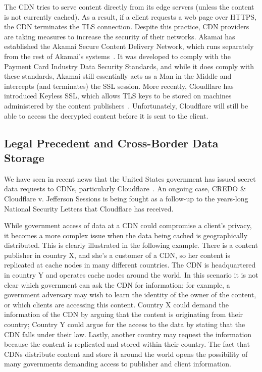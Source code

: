 The CDN tries to serve content directly from its edge servers (unless the content is not currently 
cached).  As a result, if a client requests a web page over HTTPS, the CDN terminates the TLS 
connection.  Despite this practice, CDN providers are taking measures to increase the security of 
their networks.  Akamai has established the Akamai Secure Content Delivery Network, which runs separately 
from the rest of Akamai's systems~\cite{akamai_ssl}.  It was developed to comply with the Payment Card Industry Data
Security Standards, and while it does comply with these standards, Akamai still essentially acts as a 
Man in the Middle and intercepts (and terminates) the SSL session.  More recently, Cloudflare has 
introduced Keyless SSL, which allows TLS keys to be stored on machines administered by the content 
publishers~\cite{cloudflare_keyless}.  Unfortunately, Cloudflare will still be able to access the decrypted 
content before it is sent to the client.

\subsection{Legal Precedent and Cross-Border Data Storage}
\label{sec:legal}
We have seen in recent news that the United States government has issued secret 
data requests to CDNs, particularly Cloudflare~\cite{cloudflare_nsl}.  An ongoing case, CREDO \& Cloudflare v. 
Jefferson Sessions is being fought as a follow-up to the years-long National Security Letters that 
Cloudflare has received.  

While government access of data at a CDN could compromise a client's privacy, it becomes a more complex issue when the data being cached is geographically 
distributed. This is clearly illustrated in the following example.  There is a content publisher in 
country X, and she's a customer of a CDN, so her content is replicated at cache nodes in many 
different countries.  The CDN is headquartered 
in country Y and operates cache nodes around the world.  In this scenario it is not clear which government can ask the CDN for information; for 
example, a government adversary may wish to learn the identity of the owner of the content, or which clients are accessing 
this content.  Country X could demand the information of the CDN by arguing that the content is originating 
from their country; Country Y could argue for the access to the data by stating that the CDN falls under their 
law.  Lastly, another country may request the information because the content is replicated and stored within 
their country.  The fact that CDNs distribute content and store it around the world opens the possibility of 
many governments demanding access to publisher and client information.

